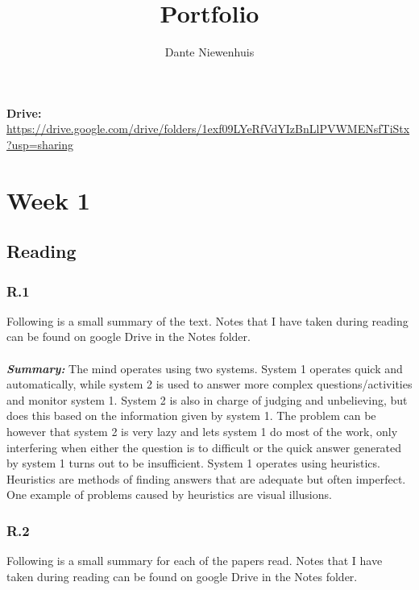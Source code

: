 \documentclass[]{article}
\title{Portfolio}
\author{Dante Niewenhuis}
\begin{document}
\maketitle
\tableofcontents

\noindent\textbf{Drive: } \url{https://drive.google.com/drive/folders/1exf09LYeRfVdYIzBnLlPVWMENsfTiStx?usp=sharing}

\section*{Week 1}

\subsection*{Reading} 

\subsubsection*{R.1} 
Following is a small summary of the text. Notes that I have taken during reading 
can be found on google Drive in the Notes folder.\\\\
\textbf{\textit{Summary:}} The mind operates using two systems. 
System 1 operates quick and automatically, while system 2 is used to answer 
more complex questions/activities and monitor system 1. System 2 is also in
charge of judging and unbelieving, but does this based on the information 
given by system 1. 
The problem can be however that system 2 is very lazy and lets system 1 do most of the work, only interfering 
when either the question is to difficult or the quick answer generated by 
system 1 turns out to be insufficient. System 1 operates using heuristics. 
Heuristics are methods of finding answers that are adequate but often imperfect.
One example of problems caused by heuristics are visual illusions.  

\subsubsection*{R.2}
Following is a small summary for each of the papers read. 
Notes that I have taken during reading can be found on google Drive in the Notes folder.
\end{document}
